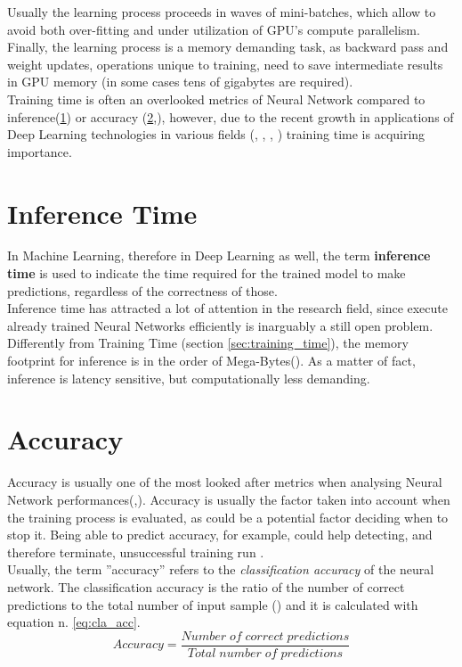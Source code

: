 Usually the learning process proceeds in waves of mini-batches, which allow to avoid both over-fitting and under utilization of GPU’s compute parallelism.\cite{8573476}\\
Finally, the learning process is a memory demanding task, as backward pass and weight updates, operations unique to training, need to save intermediate results in GPU memory (in some cases tens of gigabytes are required). \cite{rhu2016vdnn}\\
Training time is often an overlooked metrics of Neural Network compared to inference(\ref{sec:inference_time_definition}) or accuracy (\ref{sec:accuracy},\cite{8573476}), however, due to the recent growth in applications of Deep Learning technologies in various fields (\cite{bojarski2016end}, \cite{huval2015empirical}, \cite{10.1145/2959100}, \cite{amodei2015deep}) training time is acquiring importance. \cite{8573476}\\
\section{Inference Time}\label{sec:inference_time_definition}
In Machine Learning, therefore in Deep Learning as well, the term \textbf{inference time} is used to indicate the time required for the trained model to make predictions, regardless of the correctness of those. \\
Inference time has attracted a lot of attention in the research field, since execute already trained Neural Networks efficiently is inarguably a still open problem. \cite{8573476}\\
Differently from Training Time (section \ref{sec:training_time}), the memory footprint for inference is in the order of Mega-Bytes(\cite{han2016eie}). As a matter of fact, inference is latency sensitive, but computationally less demanding. \cite{8573476}\\

\section{Accuracy}\label{sec:accuracy}
Accuracy is usually one of the most looked after metrics when analysing Neural Network performances(\cite{hendrycks2019benchmarking},\cite{bianco2018dnnsbench}). Accuracy is usually the factor taken into account when the training process is evaluated, as could be a potential factor deciding when to stop it. Being able to predict accuracy, for example, could help detecting, and therefore terminate, unsuccessful training run \cite{unterthiner2021predicting}. \\
 Usually, the term ''accuracy''  refers to the \textit{classification accuracy} of the neural network. The classification accuracy is the ratio of the number of correct predictions to the total number of input sample (\cite{hussein}) and it is calculated with equation n. \ref{eq:cla_acc}.
\begin{equation}
Accuracy = \dfrac{Number\;of\;correct\;predictions}{Total\;number\;of\;predictions}
\label{eq:cla_acc}    
\end{equation}


